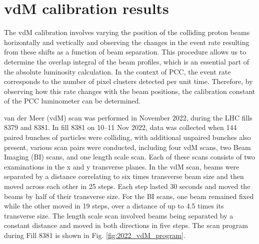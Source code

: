 \newpage
\section{vdM calibration results}

The vdM calibration involves varying the position of the colliding proton beams horizontally and vertically and observing the changes in the event rate resulting from these shifts as a function of beam separation. This procedure allows us to determine the overlap integral of the beam profiles, which is an essential part of the absolute luminosity calculation. In the context of PCC, the event rate corresponds to the number of pixel clusters detected per unit time. Therefore, by observing how this rate changes with the beam positions, the calibration constant of the PCC luminometer can be determined. %


van der Meer (vdM) scan was performed in November 2022, during the LHC fills 8379 and 8381. In fill 8381 on 10–11 Nov 2022, data was collected when 144 paired bunches of particles were colliding, with additional unpaired bunches also present, various scan pairs were conducted, including four vdM scans, two Beam Imaging (BI) scans, and one length scale scan. Each of these scans consists of two examinations in the x and y transverse planes. In the vdM scan, beams were separated by a distance correlating to six times transverse beam size and then moved across each other in 25 steps. Each step lasted 30 seconds and moved the beams by half of their transverse size. For the BI scans, one beam remained fixed while the other moved in 19 steps, over a distance of up to 4.5 times its transverse size. The length scale scan involved beams being separated by a constant distance and moved in both directions in five steps. The scan program during Fill 8381 is shown in Fig. \ref{fig:2022_vdM_program}.

